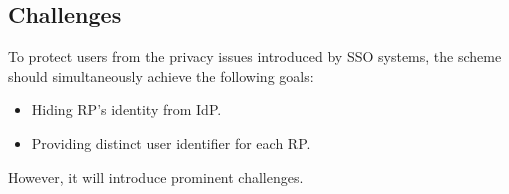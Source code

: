 \subsection{Challenges}
To protect users from the privacy issues introduced by SSO systems, the scheme should simultaneously achieve the following goals:
\begin{itemize}
\item Hiding RP's identity from IdP.
\item Providing distinct user identifier for each RP.
\end{itemize}
However, it will introduce prominent challenges.

